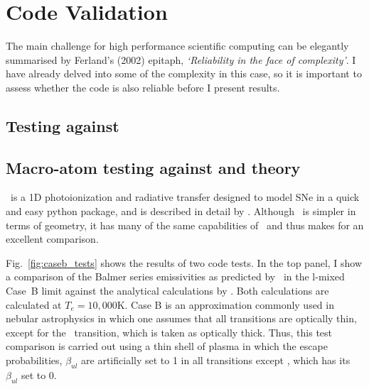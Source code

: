 


\section{Code Validation}
\label{sec:code_validation}

The main challenge for high performance scientific computing can be 
elegantly summarised by Ferland's (2002) epitaph, {\sl `Reliability in the face 
of complexity'}. I have already delved into some of the complexity in this case,
so it is important to assess whether the code is also reliable before I present
results. 

\subsection{Testing against \cld}



\subsection{Macro-atom testing against \tar and theory}

\tar\ is a 1D photoionization and radiative transfer designed to
model SNe in a quick and easy python package, and is described in detail by
\cite{kerzendorfsim}. Although \tar\ is simpler in terms
of geometry, it has many of the same capabilities of \py\ and 
thus makes for an excellent comparison. 

Fig.~\ref{fig:caseb_tests} shows the results of two code tests. 
In the top panel, I show a comparison of the Balmer series 
emissivities as predicted by \py\ in the l-mixed Case~B limit against the
analytical calculations by \cite{seaton1959}. 
Both calculations are calculated at $T_e=10,000$K.
Case B is an approximation commonly used in nebular astrophysics in which
one assumes that all transitions are optically thin, except
for the \la\ transition, which is taken as optically thick.
Thus, this test comparison is carried out using a thin shell
of plasma in which the escape probabilities, $\beta_{ul}$ 
are artificially set to 1 in all transitions except \la, which
has its $\beta_{ul}$ set to 0.

